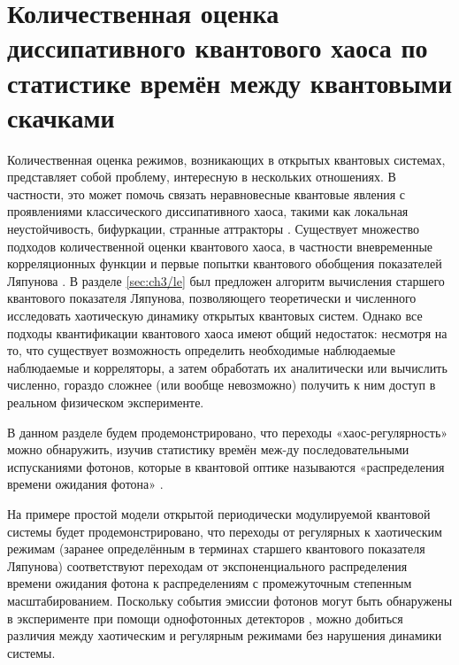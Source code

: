 \section{Количественная оценка диссипативного квантового хаоса по статистике времён между квантовыми скачками}
Количественная оценка режимов, возникающих в открытых квантовых системах, представляет собой проблему, интересную в нескольких отношениях. 
В частности, это может помочь связать неравновесные квантовые явления с проявлениями классического диссипативного хаоса, такими как локальная неустойчивость, бифуркации, странные аттракторы \cite{Ott2002}.
Существует множество подходов количественной оценки квантового хаоса, в частности вневременные корреляционных функции \cite{Rozenbaum2017, Liao2018, ChavezCarlos2019} и первые попытки квантового обобщения показателей Ляпунова \cite{Toda1987, Haake1992, Manko2000}. 
В разделе \cref{sec:ch3/le} был предложен алгоритм вычисления старшего квантового показателя Ляпунова, позволяющего теоретически и численного исследовать хаотическую динамику открытых квантовых систем.
Однако все подходы квантификации квантового хаоса имеют общий недостаток: несмотря на то, что существует возможность  определить необходимые наблюдаемые наблюдаемые и корреляторы, а затем обработать их аналитически или вычислить численно, гораздо сложнее (или вообще невозможно) получить к ним доступ в реальном физическом эксперименте. 

В данном разделе будем продемонстрировано, что переходы «хаос-регулярность» можно обнаружить, изучив статистику времён меж-ду последовательными испусканиями фотонов, которые в квантовой оптике называются «распределения времени ожидания фотона» \cite{Carmichael1993, Brange2019}.

На примере простой модели открытой периодически модулируемой квантовой системы будет продемонстрировано, что переходы от регулярных к хаотическим режимам (заранее определённым в терминах старшего квантового показателя Ляпунова) соответствуют переходам от экспоненциального распределения времени ожидания фотона к распределениям с промежуточным степенным масштабированием. Поскольку события эмиссии фотонов могут быть обнаружены в эксперименте при помощи однофотонных детекторов \cite{Delteil2014, Cohen2015}, можно добиться различия между хаотическим и регулярным режимами без нарушения динамики системы.

